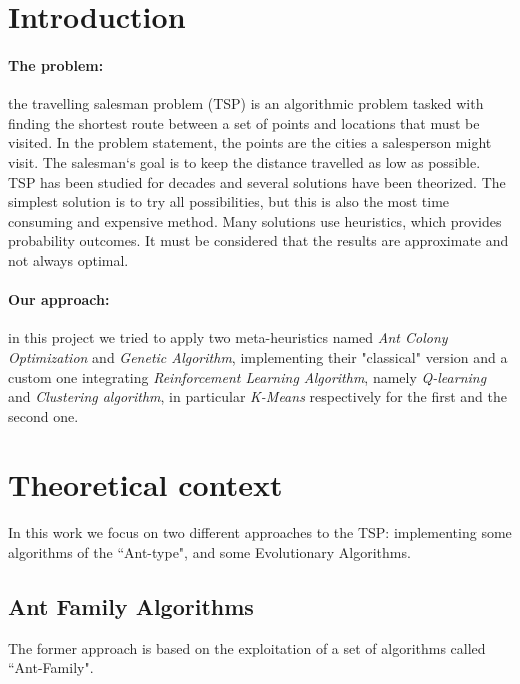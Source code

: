 \documentclass[10pt]{article}
\begin{document}
\newpage
\section{Introduction}
\paragraph{The problem:}
the travelling salesman problem (TSP) is an algorithmic problem tasked with finding the shortest route between a set of points and locations that must be visited. 
In the problem statement, the points are the cities a salesperson might visit. The salesman‘s goal is to keep the distance travelled as low as possible. 
TSP has been studied for decades and several solutions have been theorized. 
The simplest solution is to try all possibilities, but this is also the most time consuming and expensive method. 
Many solutions use heuristics, which provides probability outcomes. 
It must be considered that the results are approximate and not always optimal. 
\paragraph{Our approach:}
in this project we tried to apply two meta-heuristics named \textit{Ant Colony Optimization} and \textit{Genetic Algorithm}, implementing their "classical" version and a custom one integrating \textit{Reinforcement Learning Algorithm}, namely \textit{Q-learning} and \textit{Clustering algorithm}, in particular \textit{K-Means} respectively for the first and the second one.

\section{Theoretical context}
In this work we focus on two different approaches to the TSP: implementing some algorithms of the ``Ant-type", and some Evolutionary Algorithms.

\subsection{Ant Family Algorithms}
The former approach is based on the exploitation of a set of algorithms called ``Ant-Family".
\end{document}

